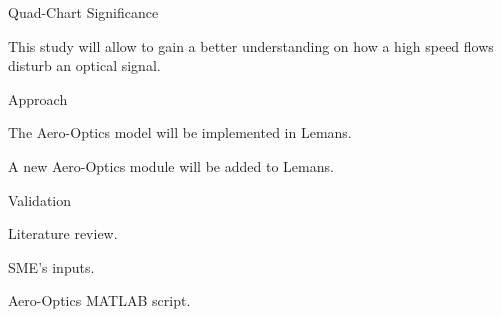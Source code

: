 





\usepackage[backend=biber, sorting=none]{biblatex}
 
\usepackage{subcaption} 
 






    \begin{frame}
        \maketitle 
    \end{frame}

    \begin{frame}{Quad-Chart}
                  {\color{blueUA} Significance}{ \item \small{This study will allow to gain a better understanding on how a high speed flows disturb an optical signal.} }
                  {\color{blueUA}Approach}{ \item \small{The Aero-Optics model will be implemented in Lemans.} 
                                            \item \small{A new Aero-Optics module will be added to Lemans.}}
                  {\color{blueUA}Validation}{ \item \small{Literature review.} 
                                              \item \small{SME's inputs.}
                                              \item \small{Aero-Optics} \tiny{MATLAB} \small{script}. }
    \end{frame}
   
